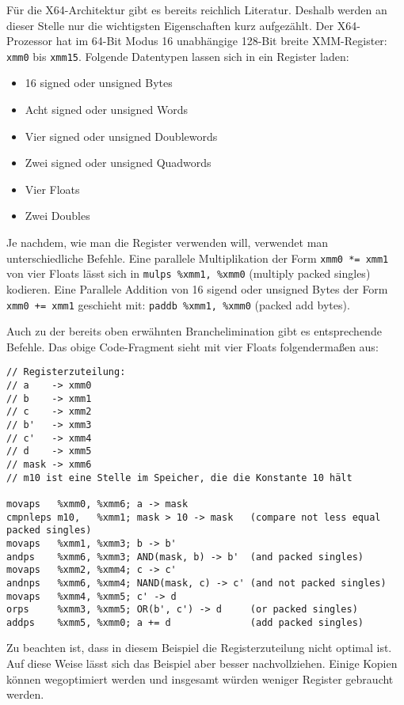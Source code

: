 \documentclass[a4paper,10pt]{article}
\begin{document}
Für die X64-Architektur gibt es bereits reichlich Literatur. Deshalb werden an dieser Stelle nur die
wichtigsten Eigenschaften kurz aufgezählt. Der X64-Prozessor hat im 64-Bit Modus 16 unabhängige
128-Bit breite XMM-Register: \texttt{xmm0} bis \texttt{xmm15}. Folgende Datentypen lassen sich in
ein Register laden:

\begin{itemize}
    \item 16 signed oder unsigned Bytes
    \item Acht signed oder unsigned Words
    \item Vier signed oder unsigned Doublewords
    \item Zwei signed oder unsigned Quadwords
    \item Vier Floats
    \item Zwei Doubles
\end{itemize}

Je nachdem, wie man die Register verwenden will, verwendet man unterschiedliche Befehle. Eine
parallele Multiplikation der Form \texttt{xmm0 *= xmm1} von vier Floats lässt sich in \texttt{mulps
\%xmm1, \%xmm0} (multiply packed singles) kodieren. Eine Parallele Addition von 16 sigend oder
unsigned Bytes der Form \texttt{xmm0 += xmm1} geschieht mit: \texttt{paddb \%xmm1, \%xmm0} (packed
add bytes). 

Auch zu der bereits oben erwähnten Branchelimination gibt es entsprechende Befehle. Das obige
Code-Fragment sieht mit vier Floats folgendermaßen aus:

\begin{verbatim}
// Registerzuteilung:
// a    -> xmm0
// b    -> xmm1
// c    -> xmm2
// b'   -> xmm3
// c'   -> xmm4
// d    -> xmm5
// mask -> xmm6
// m10 ist eine Stelle im Speicher, die die Konstante 10 hält

movaps   %xmm0, %xmm6; a -> mask
cmpnleps m10,   %xmm1; mask > 10 -> mask   (compare not less equal packed singles)
movaps   %xmm1, %xmm3; b -> b'
andps    %xmm6, %xmm3; AND(mask, b) -> b'  (and packed singles) 
movaps   %xmm2, %xmm4; c -> c'
andnps   %xmm6, %xmm4; NAND(mask, c) -> c' (and not packed singles)
movaps   %xmm4, %xmm5; c' -> d
orps     %xmm3, %xmm5; OR(b', c') -> d     (or packed singles)
addps    %xmm5, %xmm0; a += d              (add packed singles)
\end{verbatim}

Zu beachten ist, dass in diesem Beispiel die Registerzuteilung nicht optimal ist. Auf diese Weise
lässt sich das Beispiel aber besser nachvollziehen. Einige Kopien können wegoptimiert werden
und insgesamt würden weniger Register gebraucht werden.
\end{document}
